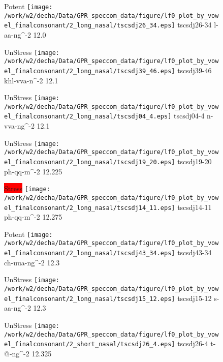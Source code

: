\documentclass{article}
\begin{document}
\begin{figure}[t]
\begin{minipage}[b]{.24\textwidth}
\colorbox{Apricot}{Potent}
\centering
\texttt{[image: /work/w2/decha/Data/GPR\_speccom\_data/figure/lf0\_plot\_by\_vowel\_finalconsonant/2\_long\_nasal/tscsdj26\_34.eps]}
tscsdj26-34 l-aa-ng\textasciicircum-2 12.0
\end{minipage}
\begin{minipage}[b]{.24\textwidth}
UnStress
\centering
\texttt{[image: /work/w2/decha/Data/GPR\_speccom\_data/figure/lf0\_plot\_by\_vowel\_finalconsonant/2\_long\_nasal/tscsdj39\_46.eps]}
tscsdj39-46 khl-vva-n\textasciicircum-2 12.1
\end{minipage}
\begin{minipage}[b]{.24\textwidth}
UnStress
\centering
\texttt{[image: /work/w2/decha/Data/GPR\_speccom\_data/figure/lf0\_plot\_by\_vowel\_finalconsonant/2\_long\_nasal/tscsdj04\_4.eps]}
tscsdj04-4 n-vva-ng\textasciicircum-2 12.1
\end{minipage}
\begin{minipage}[b]{.24\textwidth}
UnStress
\centering
\texttt{[image: /work/w2/decha/Data/GPR\_speccom\_data/figure/lf0\_plot\_by\_vowel\_finalconsonant/2\_long\_nasal/tscsdj19\_20.eps]}
tscsdj19-20 ph-qq-m\textasciicircum-2 12.225
\end{minipage}
\end{figure}
\clearpage
\begin{figure}[t]
\begin{minipage}[b]{.24\textwidth}
\colorbox{red}{Stress}
\centering
\texttt{[image: /work/w2/decha/Data/GPR\_speccom\_data/figure/lf0\_plot\_by\_vowel\_finalconsonant/2\_long\_nasal/tscsdj14\_11.eps]}
tscsdj14-11 ph-qq-m\textasciicircum-2 12.275
\end{minipage}
\begin{minipage}[b]{.24\textwidth}
\colorbox{Apricot}{Potent}
\centering
\texttt{[image: /work/w2/decha/Data/GPR\_speccom\_data/figure/lf0\_plot\_by\_vowel\_finalconsonant/2\_long\_nasal/tscsdj43\_34.eps]}
tscsdj43-34 ch-uua-ng\textasciicircum-2 12.3
\end{minipage}
\begin{minipage}[b]{.24\textwidth}
UnStress
\centering
\texttt{[image: /work/w2/decha/Data/GPR\_speccom\_data/figure/lf0\_plot\_by\_vowel\_finalconsonant/2\_long\_nasal/tscsdj15\_12.eps]}
tscsdj15-12 s-aa-ng\textasciicircum-2 12.3
\end{minipage}
\begin{minipage}[b]{.24\textwidth}
UnStress
\centering
\texttt{[image: /work/w2/decha/Data/GPR\_speccom\_data/figure/lf0\_plot\_by\_vowel\_finalconsonant/2\_short\_nasal/tscsdj26\_4.eps]}
tscsdj26-4 t-@-ng\textasciicircum-2 12.325
\end{minipage}
\end{figure}
\end{document}
